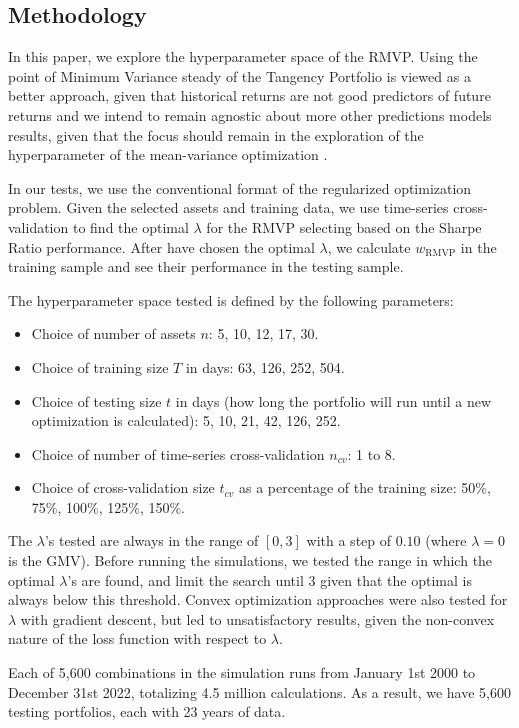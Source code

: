 \documentclass{article}
\begin{document}
\subsection{Methodology}
In this paper, we explore the hyperparameter space of the RMVP. Using the point of Minimum Variance steady of the Tangency Portfolio is viewed as a better approach, given that historical returns are not good predictors of future returns and we intend to remain agnostic about more other predictions models results, given that the focus should remain in the exploration of the hyperparameter of the mean-variance optimization \cite{campbell2008predicting}.

In our tests, we use the conventional format of the regularized optimization problem. Given the selected assets and training data, we use time-series cross-validation to find the optimal $\lambda$ for the RMVP selecting based on the Sharpe Ratio performance. After have chosen the optimal $\lambda$, we calculate $w_{\text{RMVP}}$ in the training sample and see their performance in the testing sample.

The hyperparameter space tested is defined by the following parameters:
\begin{itemize}
    \item Choice of number of assets $n$: 5, 10, 12, 17, 30.
    \item Choice of training size $T$ in days: 63, 126, 252, 504.
    \item Choice of testing size $t$ in days (how long the portfolio will run until a new optimization is calculated): 5, 10, 21, 42, 126, 252.
    \item Choice of number of time-series cross-validation $n_{cv}$: 1 to 8.
    \item Choice of cross-validation size $t_{cv}$ as a percentage of the training size: 50\%, 75\%, 100\%, 125\%, 150\%.
\end{itemize}

The $\lambda$'s tested are always in the range of $[0, 3]$ with a step of $0.10$ (where $\lambda = 0$ is the GMV). Before running the simulations, we tested the range in which the optimal $\lambda$'s are found, and limit the search until $3$ given that the optimal is always below this threshold. Convex optimization approaches were also tested for $\lambda$ with gradient descent, but led to unsatisfactory results, given the non-convex nature of the loss function with respect to $\lambda$.

Each of 5,600 combinations in the simulation runs from January 1st 2000 to December 31st 2022, totalizing 4.5 million calculations. As a result, we have 5,600 testing portfolios, each with 23 years of data.
\end{document}
